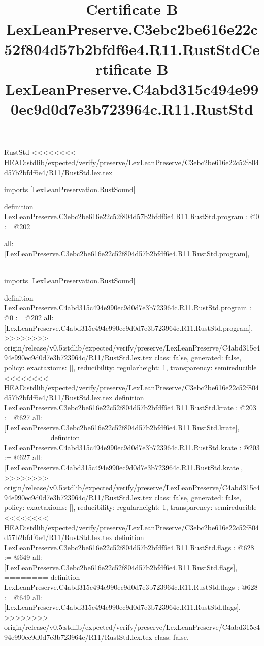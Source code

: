 \begin{lexlean}{RustStd}
<<<<<<<< HEAD:stdlib/expected/verify/preserve/LexLeanPreserve/C3ebc2be616e22c52f804d57b2bfdf6e4/R11/RustStd.lex.tex
\title{Certificate B LexLeanPreserve.C3ebc2be616e22c52f804d57b2bfdf6e4.R11.RustStd}
\begin{coremodule}
imports [LexLeanPreservation.RustSound]

definition LexLeanPreserve.C3ebc2be616e22c52f804d57b2bfdf6e4.R11.RustStd.program : @0 := @202 {
  all: [LexLeanPreserve.C3ebc2be616e22c52f804d57b2bfdf6e4.R11.RustStd.program],
========
\title{Certificate B LexLeanPreserve.C4abd315c494e990ec9d0d7e3b723964c.R11.RustStd}
\begin{coremodule}
imports [LexLeanPreservation.RustSound]

definition LexLeanPreserve.C4abd315c494e990ec9d0d7e3b723964c.R11.RustStd.program : @0 := @202 {
  all: [LexLeanPreserve.C4abd315c494e990ec9d0d7e3b723964c.R11.RustStd.program],
>>>>>>>> origin/release/v0.5:stdlib/expected/verify/preserve/LexLeanPreserve/C4abd315c494e990ec9d0d7e3b723964c/R11/RustStd.lex.tex
  class: false,
  generated: false,
  policy: exact{axioms: []},
  reducibility: regular{height: 1},
  transparency: semireducible
}
<<<<<<<< HEAD:stdlib/expected/verify/preserve/LexLeanPreserve/C3ebc2be616e22c52f804d57b2bfdf6e4/R11/RustStd.lex.tex
definition LexLeanPreserve.C3ebc2be616e22c52f804d57b2bfdf6e4.R11.RustStd.krate : @203 := @627 {
  all: [LexLeanPreserve.C3ebc2be616e22c52f804d57b2bfdf6e4.R11.RustStd.krate],
========
definition LexLeanPreserve.C4abd315c494e990ec9d0d7e3b723964c.R11.RustStd.krate : @203 := @627 {
  all: [LexLeanPreserve.C4abd315c494e990ec9d0d7e3b723964c.R11.RustStd.krate],
>>>>>>>> origin/release/v0.5:stdlib/expected/verify/preserve/LexLeanPreserve/C4abd315c494e990ec9d0d7e3b723964c/R11/RustStd.lex.tex
  class: false,
  generated: false,
  policy: exact{axioms: []},
  reducibility: regular{height: 1},
  transparency: semireducible
}
<<<<<<<< HEAD:stdlib/expected/verify/preserve/LexLeanPreserve/C3ebc2be616e22c52f804d57b2bfdf6e4/R11/RustStd.lex.tex
definition LexLeanPreserve.C3ebc2be616e22c52f804d57b2bfdf6e4.R11.RustStd.flags : @628 := @649 {
  all: [LexLeanPreserve.C3ebc2be616e22c52f804d57b2bfdf6e4.R11.RustStd.flags],
========
definition LexLeanPreserve.C4abd315c494e990ec9d0d7e3b723964c.R11.RustStd.flags : @628 := @649 {
  all: [LexLeanPreserve.C4abd315c494e990ec9d0d7e3b723964c.R11.RustStd.flags],
>>>>>>>> origin/release/v0.5:stdlib/expected/verify/preserve/LexLeanPreserve/C4abd315c494e990ec9d0d7e3b723964c/R11/RustStd.lex.tex
  class: false,
}}}
\end{coremodule}}
\end{coremodule}
\end{lexlean}
